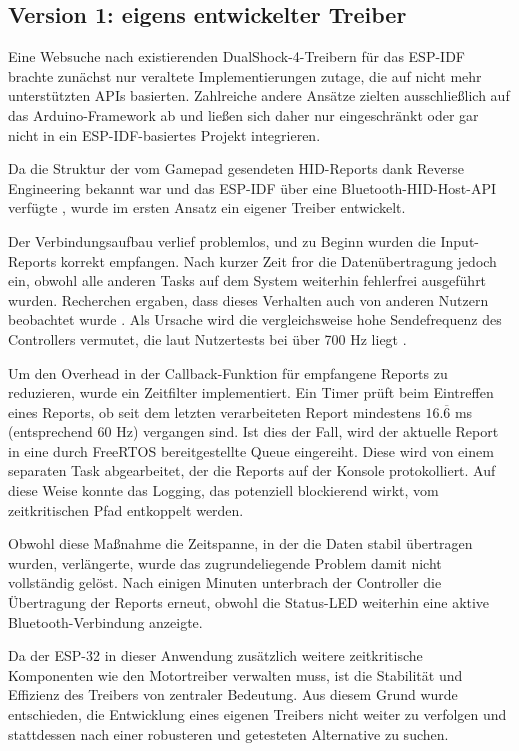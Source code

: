 \subsection{Version 1: eigens entwickelter Treiber}

Eine Websuche nach existierenden DualShock-4-Treibern für das ESP-IDF brachte zunächst nur veraltete Implementierungen zutage, die auf nicht mehr unterstützten APIs basierten. 
Zahlreiche andere Ansätze zielten ausschließlich auf das Arduino-Framework ab und ließen sich daher nur eingeschränkt oder gar nicht in ein ESP-IDF-basiertes Projekt integrieren.

Da die Struktur der vom Gamepad gesendeten HID-Reports dank Reverse Engineering bekannt war und das ESP-IDF über eine Bluetooth-HID-Host-API verfügte \cite{esp_hib_bt_api}, wurde im ersten Ansatz ein eigener Treiber entwickelt.

Der Verbindungsaufbau verlief problemlos, und zu Beginn wurden die Input-Reports korrekt empfangen. 
Nach kurzer Zeit fror die Datenübertragung jedoch ein, obwohl alle anderen Tasks auf dem System weiterhin fehlerfrei ausgeführt wurden. 
Recherchen ergaben, dass dieses Verhalten auch von anderen Nutzern beobachtet wurde \cite{esp_hib_bt_api_issues}. 
Als Ursache wird die vergleichsweise hohe Sendefrequenz des Controllers vermutet, die laut Nutzertests bei über 700 Hz liegt \cite{esp_ds4_hid_reports}.

Um den Overhead in der Callback-Funktion für empfangene Reports zu reduzieren, wurde ein Zeitfilter implementiert. 
Ein Timer prüft beim Eintreffen eines Reports, ob seit dem letzten verarbeiteten Report mindestens $16.\overline{6}$ ms (entsprechend 60 Hz) vergangen sind. 
Ist dies der Fall, wird der aktuelle Report in eine durch FreeRTOS bereitgestellte Queue eingereiht. 
Diese wird von einem separaten Task abgearbeitet, der die Reports auf der Konsole protokolliert. 
Auf diese Weise konnte das Logging, das potenziell blockierend wirkt, vom zeitkritischen Pfad entkoppelt werden.

Obwohl diese Maßnahme die Zeitspanne, in der die Daten stabil übertragen wurden, verlängerte, wurde das zugrundeliegende Problem damit nicht vollständig gelöst. 
Nach einigen Minuten unterbrach der Controller die Übertragung der Reports erneut, obwohl die Status-LED weiterhin eine aktive Bluetooth-Verbindung anzeigte.

Da der ESP-32 in dieser Anwendung zusätzlich weitere zeitkritische Komponenten wie den Motortreiber verwalten muss, ist die Stabilität und Effizienz des Treibers von zentraler Bedeutung.
Aus diesem Grund wurde entschieden, die Entwicklung eines eigenen Treibers nicht weiter zu verfolgen und stattdessen nach einer robusteren und getesteten Alternative zu suchen.

